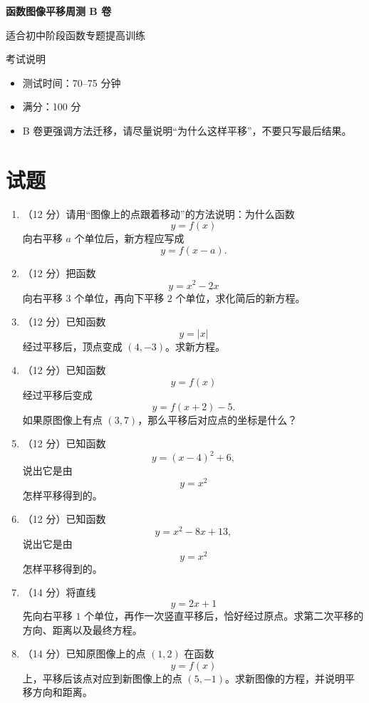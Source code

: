\documentclass[11pt,a4paper,fontset=fandol]{ctexart}
\newcommand{\answerspace}{\vspace{2.3cm}}
\newcommand{\biganswerspace}{\vspace{3.2cm}}
\begin{document}
\thispagestyle{empty}
\begin{center}
{\fontsize{22}{28}\selectfont\bfseries 函数图像平移周测 B 卷\par}
\vspace{0.4cm}
{\large 适合初中阶段函数专题提高训练\par}
\end{center}

\begin{infobox}{考试说明}
\begin{itemize}
  \item 测试时间：70--75 分钟
  \item 满分：100 分
  \item B 卷更强调方法迁移，请尽量说明“为什么这样平移”，不要只写最后结果。
\end{itemize}
\end{infobox}

\section{试题}

\begin{enumerate}
  \item （12 分）请用“图像上的点跟着移动”的方法说明：为什么函数
  \[
  y=f(x)
  \]
  向右平移 $a$ 个单位后，新方程应写成
  \[
  y=f(x-a).
  \]
  \biganswerspace

  \item （12 分）把函数
  \[
  y=x^2-2x
  \]
  向右平移 $3$ 个单位，再向下平移 $2$ 个单位，求化简后的新方程。
  \answerspace

  \item （12 分）已知函数
  \[
  y=|x|
  \]
  经过平移后，顶点变成 $(4,-3)$。求新方程。
  \answerspace

  \item （12 分）已知函数
  \[
  y=f(x)
  \]
  经过平移后变成
  \[
  y=f(x+2)-5.
  \]
  如果原图像上有点 $(3,7)$，那么平移后对应点的坐标是什么？
  \answerspace

  \item （12 分）已知函数
  \[
  y=(x-4)^2+6,
  \]
  说出它是由
  \[
  y=x^2
  \]
  怎样平移得到的。
  \answerspace

  \item （12 分）已知函数
  \[
  y=x^2-8x+13,
  \]
  说出它是由
  \[
  y=x^2
  \]
  怎样平移得到的。
  \answerspace

  \item （14 分）将直线
  \[
  y=2x+1
  \]
  先向右平移 $1$ 个单位，再作一次竖直平移后，恰好经过原点。求第二次平移的方向、距离以及最终方程。
  \biganswerspace

  \item （14 分）已知原图像上的点 $(1,2)$ 在函数
  \[
  y=f(x)
  \]
  上，平移后该点对应到新图像上的点 $(5,-1)$。求新图像的方程，并说明平移方向和距离。
  \biganswerspace
\end{enumerate}
\end{document}
